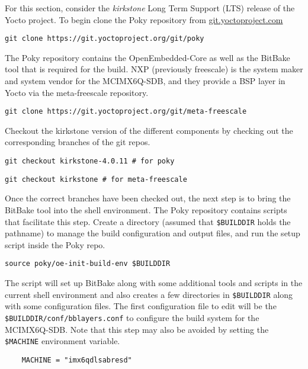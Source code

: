 For this section, consider the \textit{kirkstone} Long Term Support (LTS) release of the Yocto project. To begin clone the Poky repository from \href{https://git.yoctoproject.com}{git.yoctoproject.com}

\begin{verbatim}
git clone https://git.yoctoproject.org/git/poky
\end{verbatim}

The Poky repository contains the OpenEmbedded-Core as well as the BitBake tool that is required for the build. NXP (previously freescale) is the system maker and system vendor for the MCIMX6Q-SDB, and they provide a BSP layer in Yocto via the meta-freescale repository.

\begin{verbatim}
git clone https://git.yoctoproject.org/git/meta-freescale
\end{verbatim}

Checkout the kirkstone version of the different components by checking out the corresponding branches of the git repos.

\begin{verbatim}
git checkout kirkstone-4.0.11 # for poky
\end{verbatim}

\begin{verbatim}
git checkout kirkstone # for meta-freescale
\end{verbatim}

Once the correct branches have been checked out, the next step is to bring the BitBake tool into the shell environment. The Poky repository contains scripts that facilitate this step. Create a directory (assumed that \texttt{\$BUILDDIR} holds the pathname) to manage the build configuration and output files, and run the setup script inside the Poky repo.

\begin{verbatim}
source poky/oe-init-build-env $BUILDDIR
\end{verbatim}

The script will set up BitBake along with some additional tools and scripts in the current shell environment and also creates a few directories in \texttt{\$BUILDDIR} along with some configuration files. The first configuration file to edit will be the \texttt{\$BUILDDIR/conf/bblayers.conf} to configure the build system for the MCIMX6Q-SDB. Note that this step may also be avoided by setting the \texttt{\$MACHINE} environment variable.

\begin{verbatim}
	MACHINE = "imx6qdlsabresd"
\end{verbatim}

